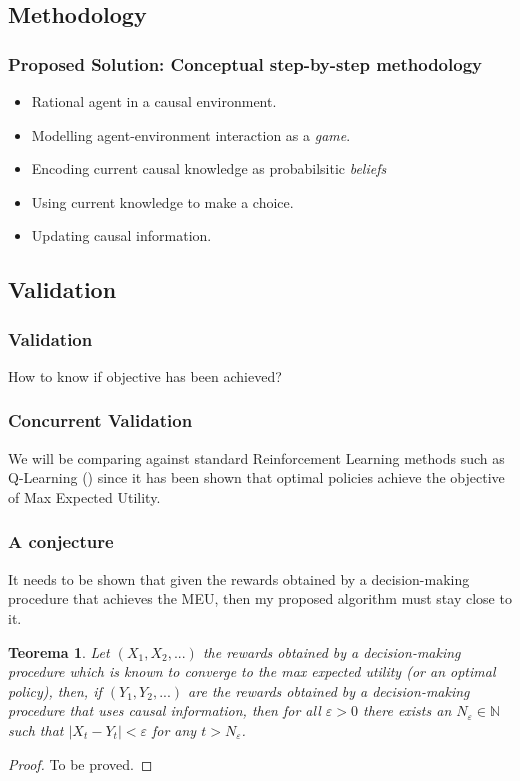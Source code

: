 \documentclass{beamer}
\theoremstyle{plain}
\newtheorem{teo}{Teorema}
\begin{document}
\subsection{Methodology}
\begin{frame}
\frametitle{Proposed Solution: Conceptual step-by-step methodology}
\begin{itemize}
\item Rational agent in a causal environment.
\item Modelling agent-environment interaction as a \textit{game}.
\item Encoding current causal knowledge as probabilsitic \textit{beliefs}
\item Using current knowledge to make a choice.
\item Updating causal information.
\end{itemize}
\end{frame}

\subsection{Validation}
\begin{frame}
\frametitle{Validation}
How to know if objective has been achieved?
\end{frame}

\begin{frame}
\frametitle{Concurrent Validation}
We will be comparing against standard Reinforcement Learning methods such as Q-Learning (\cite{watkins1992q}) since it has been shown that optimal policies achieve the objective of Max Expected Utility.
\end{frame}

\begin{frame}
\frametitle{A conjecture}
It needs to be shown that given the rewards obtained by a decision-making procedure that achieves the MEU, then my proposed algorithm must stay close to it.
\begin{teo}
Let $(X_1,X_2,...)$ the rewards obtained by a decision-making procedure which is known to converge to the max expected utility (or an optimal policy), then, if $(Y_1, Y_2,...)$ are the rewards obtained by a decision-making procedure that uses causal information, then for all $\varepsilon > 0$ there exists an $N_\varepsilon \in \mathbb{N}$ such that $ | X_t - Y_t | < \varepsilon$ for any $t > N_\varepsilon$. 
\end{teo}
\begin{proof}
To be proved.
\end{proof}
\end{frame}
\end{document}
